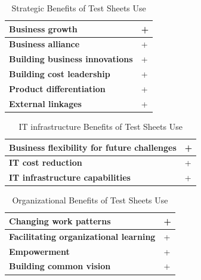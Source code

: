 \begin{table}[h]
	\begin{center}
		\begin{tabular}{| l | l |  }
			\hline
			\textbf{Business growth} & +  \\
			\hline
			\textbf{Business alliance} & + \\
			\hline
			\textbf{Building business innovations} & +  \\
			\hline
			\textbf{Building cost leadership} & + \\
			\hline 
			\textbf{Product differentiation} & + \\
			\hline
			\textbf{External linkages} & + \\
			\hline
		\end{tabular}
	\end{center}
	\caption{Strategic Benefits of Test Sheets Use}
\end{table}
		
\begin{table}[h]
	\begin{center}
		\begin{tabular}{| l | l |  }
			\hline
			\textbf{Business flexibility for future challenges} & +  \\
			\hline
			\textbf{IT cost reduction} & + \\
			\hline
			\textbf{IT infrastructure capabilities} & +  \\
			\hline
		\end{tabular}
	\end{center}
	\caption{IT infrastructure Benefits of Test Sheets Use}
\end{table}

\begin{table}[h]
	\begin{center}
		\begin{tabular}{| l | l |  }
			\hline
			\textbf{Changing work patterns} & +  \\
			\hline
			\textbf{Facilitating organizational learning} & + \\
			\hline
			\textbf{Empowerment} & +  \\
			\hline
			\textbf{Building common vision} & + \\
			\hline
		\end{tabular}
	\end{center}
	\caption{Organizational Benefits of Test Sheets Use}
\end{table}
	
	
